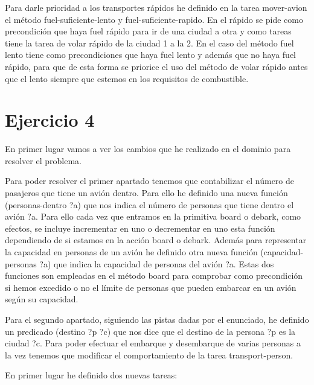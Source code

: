 \documentclass[12pt,a4paper]{article}
\begin{document}
Para darle prioridad a los transportes rápidos he definido en la tarea mover-avion el método fuel-suficiente-lento y fuel-suficiente-rapido. En el rápido se pide como precondición que haya fuel rápido para ir de una ciudad a otra y como tareas tiene la tarea de volar rápido de la ciudad 1 a la 2. En el caso del método fuel lento tiene como precondiciones que haya fuel lento y además que no haya fuel rápido, para que de esta forma se priorice el uso del método de volar rápido antes que el lento siempre que estemos en los requisitos de combustible.

\section{Ejercicio 4}

En primer lugar vamos a ver los cambios que he realizado en el dominio para resolver el problema.

Para poder resolver el primer apartado tenemos que contabilizar el número de pasajeros que tiene un avión dentro. Para ello he definido una nueva función (personas-dentro ?a) que nos indica el número de personas que tiene dentro el avión ?a. Para ello cada vez que entramos en la primitiva board o debark, como efectos, se incluye incrementar en uno o decrementar en uno esta función dependiendo de si estamos en la acción board o debark. Además para representar la capacidad en personas de un avión he definido otra nueva función (capacidad-personas ?a) que indica la capacidad de personas del avión ?a. Estas dos funciones son empleadas en el método board para comprobar como precondición si hemos excedido o no el límite de personas que pueden embarcar en un avión según su capacidad.

Para el segundo apartado, siguiendo las pistas dadas por el enunciado, he definido un predicado (destino ?p ?c) que nos dice que el destino de la persona ?p es la ciudad ?c. Para poder efectuar el embarque y desembarque de varias personas a la vez tenemos que modificar el comportamiento de la tarea transport-person.

En primer lugar he definido dos nuevas tareas:
\end{document}
